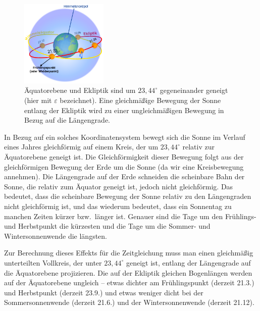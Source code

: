 \begin{figure}
\includegraphics[width=0.37\textwidth]{./Bilder/Ecliptic.png}
\caption{\label{fig_Ekliptik}%
\"Aquatorebene und Ekliptik sind um $23,44^\circ$ gegeneinander geneigt (hier mit
$\varepsilon$ bezeichnet). Eine
gleichm\"a\ss ige Bewegung der Sonne entlang der Ekliptik wird zu einer
ungleichm\"a\ss igen Bewegung in Bezug auf die L\"angengrade.} 
\end{figure}

In Bezug auf ein solches Koordinatensystem bewegt sich die Sonne im Verlauf eines Jahres
gleichf\"ormig auf einem Kreis, der um $23,44^\circ$ relativ zur \"Aquatorebene geneigt ist. 
Die Gleichf\"ormigkeit dieser Bewegung folgt aus der gleichf\"ormigen Bewegung der Erde um
die Sonne (da wir eine Kreisbewegung annehmen). Die L\"angengrade auf der Erde schneiden
die scheinbare Bahn der Sonne, die relativ zum \"Aquator geneigt ist, jedoch nicht gleichf\"ormig.
Das bedeutet, dass die scheinbare Bewegung der Sonne relativ zu den L\"angengraden
nicht gleichf\"ormig ist, und das wiederum bedeutet, dass ein Sonnentag zu manchen Zeiten
k\"urzer bzw.\ l\"anger ist. Genauer sind die Tage um den Fr\"uhlings- und Herbstpunkt die
k\"urzesten und die Tage um die Sommer- und Wintersonnenwende die l\"angsten.  
 
Zur Berechnung dieses Effekts f\"ur die Zeitgleichung 
muss man einen gleichm\"a\ss ig unterteilten Vollkreis, der unter $23,44^\circ$ geneigt ist,
entlang der L\"angengrade auf die \"Aquatorebene projizieren. 
Die auf der Ekliptik gleichen
Bogenl\"angen werden auf der \"Aquatorebene ungleich -- etwas dichter am Fr\"uhlingspunkt (derzeit
21.3.) und Herbstpunkt (derzeit 23.9.) und etwas weniger dicht bei der Sommersonnenwende
(derzeit 21.6.) und der Wintersonnenwende 
(derzeit 21.12).      
   
